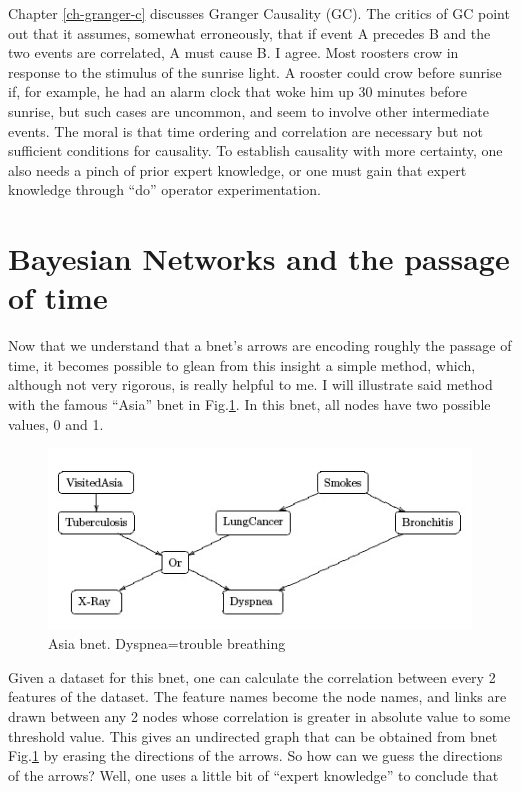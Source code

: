 Chapter \ref{ch-granger-c} discusses
 Granger Causality
(GC). The critics of GC point out that it assumes, somewhat erroneously,
that if event A precedes B and the two events are correlated, A must
cause B. I agree. Most roosters crow in response to the stimulus of the
sunrise light.  A rooster could crow before sunrise if,  for example,  he
had an alarm clock that woke him up 30 minutes before sunrise, but such cases
are uncommon, and seem to involve other intermediate events.  The moral is
that time ordering and correlation are necessary but not sufficient
conditions for causality. To establish causality with more certainty, one
also needs a pinch of prior expert knowledge, or one must gain that expert
knowledge through ``do” operator experimentation.



\section{Bayesian Networks and the passage of time}

Now that we understand that a bnet’s arrows are encoding roughly the passage
of time, it becomes possible to glean from this insight a simple method,
which, although not very rigorous, is really helpful to me. I will illustrate
said method with the famous ``Asia” bnet in Fig.\ref{fig-asia}.
 In this bnet, all nodes
have two  possible values, 0 and 1.

\begin{figure}[h!]
\centering
\includegraphics[width=5in]
{bnets-time/asia.jpg}
\caption{Asia bnet. Dyspnea=trouble breathing}
\label{fig-asia}
\end{figure}


Given a dataset for this bnet, one can calculate the correlation between
every 2 features of the dataset. The feature names become the node names, and
links are drawn between any 2 nodes whose correlation is greater in absolute
value to some threshold value. This gives an undirected graph that can be
obtained from bnet Fig.\ref{fig-asia}
 by erasing the directions of the arrows. So how
can we guess the directions of the arrows? Well, one uses a little bit of
``expert knowledge” to conclude that

